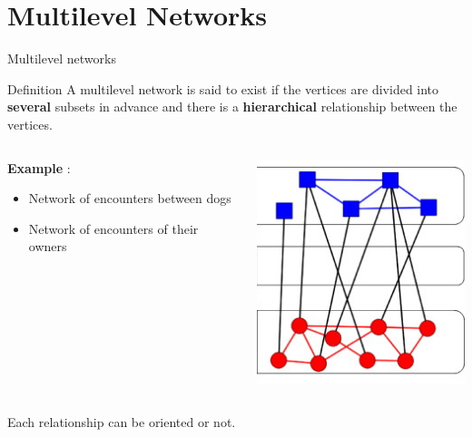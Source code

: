 \documentclass[compress,10pt]{beamer}
\begin{document}
\section{Multilevel Networks}
 
\begin{frame}{Multilevel networks}
  \begin{block}{Definition}
A multilevel network is said to exist if the vertices are divided into \textbf{\textcolor{dgreen}{several}} subsets in advance and there is a \textbf{\textcolor{dgreen}{hierarchical}} relationship between the vertices.
\end{block}
\vspace{2em}


\begin{columns}
\begin{column}{0.5\textwidth}
\textbf{Example} : 
\begin{itemize}
\item Network of encounters between dogs
\item Network of encounters of their owners
\end{itemize}
\end{column}
\begin{column}{0.5\textwidth} 
 \begin{center}
  \includegraphics [width = 0.6 \linewidth]{plots/multilevel_network.png}
\end{center}
\end{column}
\end{columns}

Each relationship can be oriented or not. 
\end{frame}
\end{document}
